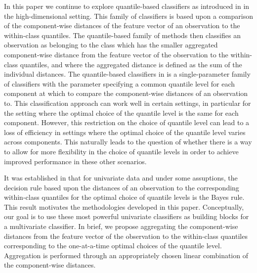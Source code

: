 In this paper we continue to explore quantile-based classifiers as introduced in
\cite{hennig2016} in the high-dimensional setting.  This family of classifiers
is based upon a comparison of the component-wise distances of the feature vector
of an observation to the within-class quantiles.  The quantile-based family of
methods then classifies an observation as belonging to the class which has the
smaller aggregated component-wise distance from the feature vector of the
observation to the within-class quantiles, and where the aggregated distance is
defined as the sum of the individual distances.  The quantile-based classifiers
in \cite{hennig2016} is a single-parameter family of classifiers with the
parameter specifying a common quantile level for each component at which to
compare the component-wise distances of an observation to.  This classification
approach can work well in certain settings, in particular for the setting where
the optimal choice of the quantile level is the same for each component.
However, this restriction on the choice of quantile level can lead to a loss of
efficiency in settings where the optimal choice of the quantile level varies
across components.  This naturally leads to the question of whether there is a
way to allow for more flexibility in the choice of quantile levels in order to
achieve improved performance in these other scenarios.

It was established in \cite{hennig2016} that for univariate data and under some
assuptions, the decision rule based upon the distances of an observation to the
corresponding within-class quantiles for the optimal choice of quantile levels
is the Bayes rule.  This result motivates the methodologies developed in this
paper.  Conceptually, our goal is to use these most powerful univariate
classifiers as building blocks for a multivariate classifier.  In brief, we
propose aggregating the component-wise distances from the feature vector of the
observation to the within-class quantiles corresponding to the one-at-a-time
optimal choices of the quantile level.  Aggregation is performed through an
appropriately chosen linear combination of the component-wise distances.

